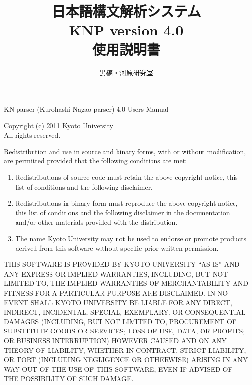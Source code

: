 \documentclass[a4j,11pt,titlepage]{jarticle}
\title{\bf 日本語構文解析システム \\
        KNP version 4.0 \\
        使用説明書}
\author{黒橋・河原研究室}
\date{平成23年12月\\
\rule{0mm}{110mm}Copyright \copyright\ 2011\begin{tabular}[t]{l}
                                京都大学大学院情報学研究科 \\
                                \end{tabular}
}
\begin{document}
\maketitle

\thispagestyle{empty}

\vspace*{\fill}

\begin{small}
\noindent
KN parser (Kurohashi-Nagao parser) 4.0 Users Manual

\noindent
Copyright (c) 2011 Kyoto University \\
All rights reserved.

\noindent
Redistribution and use in source and binary forms, with or without
modification, are permitted provided that the following conditions
are met:

\begin{enumerate}
 \item Redistributions of source code must retain the above copyright
   notice, this list of conditions and the following disclaimer.
 \item Redistributions in binary form must reproduce the above copyright
   notice, this list of conditions and the following disclaimer in the
   documentation and/or other materials provided with the distribution.
 \item The name Kyoto University may not be used to endorse or promote
   products derived from this software without specific prior written
   permission.
\end{enumerate}

\noindent
THIS SOFTWARE IS PROVIDED BY KYOTO UNIVERSITY ``AS IS'' AND ANY
EXPRESS OR IMPLIED WARRANTIES, INCLUDING, BUT NOT LIMITED TO, THE
IMPLIED WARRANTIES OF MERCHANTABILITY AND FITNESS FOR A PARTICULAR
PURPOSE ARE DISCLAIMED.  IN NO EVENT SHALL KYOTO UNIVERSITY BE
LIABLE FOR ANY DIRECT, INDIRECT, INCIDENTAL, SPECIAL, EXEMPLARY, OR
CONSEQUENTIAL DAMAGES (INCLUDING, BUT NOT LIMITED TO, PROCUREMENT OF
SUBSTITUTE GOODS OR SERVICES; LOSS OF USE, DATA, OR PROFITS; OR BUSINESS
INTERRUPTION) HOWEVER CAUSED AND ON ANY THEORY OF LIABILITY, WHETHER IN
CONTRACT, STRICT LIABILITY, OR TORT (INCLUDING NEGLIGENCE OR OTHERWISE)
ARISING IN ANY WAY OUT OF THE USE OF THIS SOFTWARE, EVEN IF ADVISED OF
THE POSSIBILITY OF SUCH DAMAGE.

\vspace{1cm}


\end{small}
\end{document}
